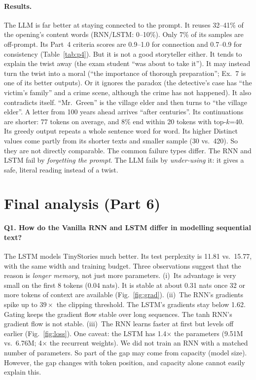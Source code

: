 \documentclass[11pt,a4paper]{article}
\begin{document}
\paragraph{Results.} The LLM is far better at staying connected to the prompt. It reuses 32--41\%
of the opening's content words (RNN/LSTM: 0--10\%). Only 7\% of its samples are off-prompt. Its
Part~4 criteria scores are 0.9--1.0 for connection and 0.7--0.9 for consistency
(Table~\ref{tab:p4}). But it is not a good storyteller either. It tends to explain the twist away
(the exam student ``was about to take it''). It may instead turn the twist into a moral (``the
importance of thorough preparation''; Ex.~7 is one of its better outputs). Or it ignores the
paradox (the detective's case has ``the victim's family'' and a crime scene, although the crime has
not happened). It also contradicts itself. ``Mr.\ Green'' is the village elder and then turns to
``the village elder''. A letter from 100 years ahead arrives ``after centuries''. Its continuations
are shorter: 77 tokens on average, and 8\% end within 20 tokens with top-$k$=40. Its greedy output
repeats a whole sentence word for word. Its higher Distinct values come partly from its
shorter texts and smaller sample (30 vs.\ 420). So they are not directly comparable. The common failure types differ. The RNN and LSTM fail by \emph{forgetting the prompt}.
The LLM fails by \emph{under-using} it: it gives a safe, literal reading instead of a twist.

\section{Final analysis (Part 6)}
\label{sec:analysis}
\paragraph{Q1. How do the Vanilla RNN and LSTM differ in modelling sequential text?} The LSTM
models TinyStories much better. Its test perplexity is 11.81 vs.\ 15.77, with the same width and
training budget. Three observations suggest that the reason is \emph{longer memory}, not just more
parameters. (i)~Its advantage is very small on the first 8 tokens (0.04 nats). It is stable at
about 0.31 nats once 32 or more tokens of context are available (Fig.~\ref{fig:grad}). (ii)~The
RNN's gradients spike up to $39\times$ the clipping threshold. The LSTM's gradients stay below
1.62. Gating keeps the gradient flow stable over long sequences. The tanh RNN's gradient flow is
not stable. (iii)~The RNN learns faster at first but levels off earlier (Fig.~\ref{fig:loss}).
One caveat: the LSTM has 1.4$\times$ the parameters (9.51M vs.\ 6.76M; 4$\times$ the recurrent
weights). We did not train an RNN with a matched number of parameters. So part of the gap may come
from capacity (model size). However, the gap changes with token position, and capacity alone
cannot easily explain this.
\end{document}
